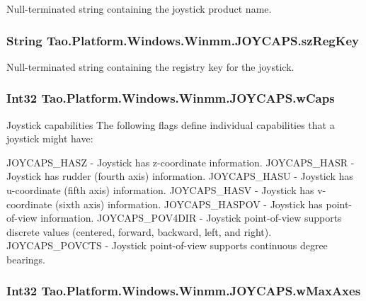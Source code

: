 Null-\/terminated string containing the joystick product name. 

\hypertarget{struct_tao_1_1_platform_1_1_windows_1_1_winmm_1_1_j_o_y_c_a_p_s_a0390a90623660ad4080990d2b8f7791b}{
\subsubsection[{szRegKey}]{\setlength{\rightskip}{0pt plus 5cm}String {\bf Tao.Platform.Windows.Winmm.JOYCAPS.szRegKey}}}
\label{struct_tao_1_1_platform_1_1_windows_1_1_winmm_1_1_j_o_y_c_a_p_s_a0390a90623660ad4080990d2b8f7791b}


Null-\/terminated string containing the registry key for the joystick. 

\hypertarget{struct_tao_1_1_platform_1_1_windows_1_1_winmm_1_1_j_o_y_c_a_p_s_a52448bee08348ae1de8cf5a8b03cd9b1}{
\subsubsection[{wCaps}]{\setlength{\rightskip}{0pt plus 5cm}Int32 {\bf Tao.Platform.Windows.Winmm.JOYCAPS.wCaps}}}
\label{struct_tao_1_1_platform_1_1_windows_1_1_winmm_1_1_j_o_y_c_a_p_s_a52448bee08348ae1de8cf5a8b03cd9b1}


Joystick capabilities The following flags define individual capabilities that a joystick might have: 

JOYCAPS\_\-HASZ -\/ Joystick has z-\/coordinate information. JOYCAPS\_\-HASR -\/ Joystick has rudder (fourth axis) information. JOYCAPS\_\-HASU -\/ Joystick has u-\/coordinate (fifth axis) information. JOYCAPS\_\-HASV -\/ Joystick has v-\/coordinate (sixth axis) information. JOYCAPS\_\-HASPOV -\/ Joystick has point-\/of-\/view information. JOYCAPS\_\-POV4DIR -\/ Joystick point-\/of-\/view supports discrete values (centered, forward, backward, left, and right). JOYCAPS\_\-POVCTS -\/ Joystick point-\/of-\/view supports continuous degree bearings. \hypertarget{struct_tao_1_1_platform_1_1_windows_1_1_winmm_1_1_j_o_y_c_a_p_s_a74f7c8327a0f988667bc71000264aca4}{
\subsubsection[{wMaxAxes}]{\setlength{\rightskip}{0pt plus 5cm}Int32 {\bf Tao.Platform.Windows.Winmm.JOYCAPS.wMaxAxes}}}
\label{struct_tao_1_1_platform_1_1_windows_1_1_winmm_1_1_j_o_y_c_a_p_s_a74f7c8327a0f988667bc71000264aca4}


